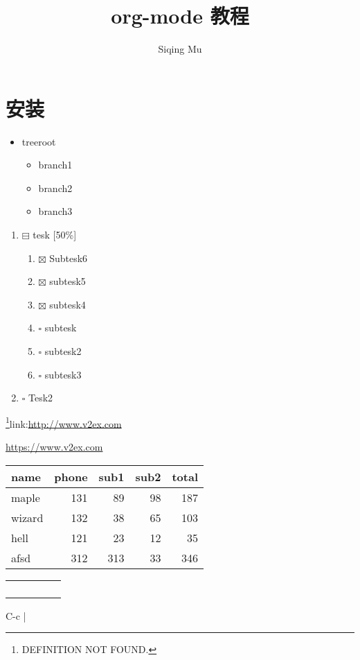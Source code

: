 \documentclass[11pt]{article}
\author{Siqing Mu}
\date{}
\title{org-mode 教程}
\begin{document}
\maketitle
\tableofcontents


\section{安装}
\label{sec-1}

\begin{itemize}
\item treeroot
\begin{itemize}
\item branch1
\item branch2
\item branch3
\end{itemize}
\end{itemize}


\begin{enumerate}
\item $\boxminus$ tesk [50\%]
\begin{enumerate}
\item $\boxtimes$ Subtesk6
\item $\boxtimes$ subtesk5
\item $\boxtimes$ subtesk4
\item $\square$ subtesk
\item $\square$ subtesk2
\item $\square$ subtesk3
\end{enumerate}

\item $\square$ Tesk2
\end{enumerate}


\footnote{DEFINITION NOT FOUND.}link:\url{http://www.v2ex.com}

\url{https://www.v2ex.com}

\begin{center}
\begin{tabular}{lrrrr}
name & phone & sub1 & sub2 & total\\
\hline
maple & 131 & 89 & 98 & 187\\
wizard & 132 & 38 & 65 & 103\\
hell & 121 & 23 & 12 & 35\\
afsd & 312 & 313 & 33 & 346\\
\end{tabular}
\end{center}

\begin{center}
\begin{tabular}{lllll}
 &  &  &  & \\
\hline
 &  &  &  & \\
 &  &  &  & \\
 &  &  &  & \\
 &  &  &  & \\
\end{tabular}
\end{center}
C-c |
\end{document}
